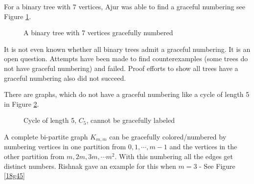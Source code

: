 For a binary tree with 7 vertices, Ajur was able to find a graceful numbering see Figure \ref{19g3}.

\begin{figure}
\begin{center}


\caption{A binary tree with 7 vertices gracefully numbered }\label{19g3}
\end{center}
\end{figure}

It is not even known whether all binary trees admit a graceful numbering. It is an open question. Attempts have been made to find counterexamples (some trees do not have graceful numbering) and failed. Proof efforts to show all trees have a graceful numbering also did not succeed.
  
  There are graphs, which do not have a graceful numbering like a cycle of length 5 in  Figure \ref{19g4}.

\begin{figure}
\begin{center}


\caption{Cycle of length 5, $C_5$, cannot be gracefully labeled }\label{19g4}
\end{center}
\end{figure}

A complete bi-partite graph $K_{m,m}$ can be gracefully colored/numbered by numbering vertices in one partition from $0,1,\cdots,m-1$ and the vertices
in the other partition from $m,2m,3m,\cdots m^2$. With this numbering all the edges get distinct numbers. Rishnak gave an example for this when $m=3$ - See Figure \ref{18g45}

